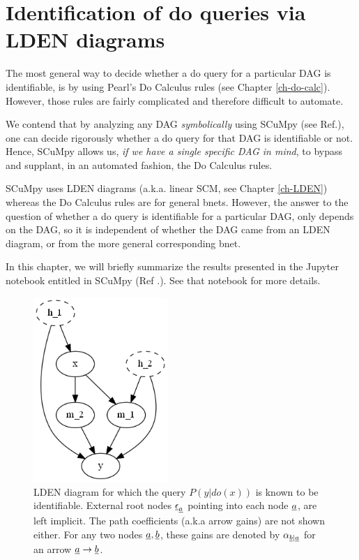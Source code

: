 \chapter{Identification of do queries via LDEN
diagrams}
\label{ch-iden-LDEN}

The most general way to decide whether a do query for
a particular DAG is identifiable, is by using Pearl's
Do Calculus rules (see Chapter \ref{ch-do-calc}). However, those rules are fairly 
complicated and therefore difficult to automate.


We contend that by analyzing any DAG {\it symbolically} using 
SCuMpy (see Ref.\cite{scumpy}), one can decide rigorously 
whether a
do query for that DAG is identifiable or not. Hence, SCuMpy
allows us, {\it if we have a single specific DAG in mind}, to bypass and supplant, in an automated 
fashion, the Do Calculus rules.

SCuMpy uses
LDEN diagrams (a.k.a. linear SCM, see Chapter \ref{ch-LDEN}) whereas
the Do Calculus rules are for general bnets.
However, the answer to the question
of whether a do query is identifiable
for a particular DAG,
only depends on the DAG,
so it is independent of whether
the DAG came from an LDEN diagram, or from
the more general corresponding bnet.


In this chapter,
we will briefly summarize the results
presented in the
Jupyter notebook entitled  in SCuMpy (Ref
.\cite{scumpy}). See that notebook
for more details.

\begin{figure}[h!]
\centering
\includegraphics[width=2in]
{iden-LDEN/uncon-children.png}
\caption{LDEN diagram for which 
the query $P(y|do(x))$
is  known to be identifiable.
External root nodes $\rveps_\rva$ 
pointing into each node $\rva$,
are left implicit.
The path coefficients (a.k.a
arrow gains)
are not shown either. 
For any two nodes $\rva, \rvb$,
these gains
 are denoted
   by $\alp_{\rvb|\rva}$
for an arrow $\rva\rarrow \rvb$.}
\label{fig-uncon-children}
\end{figure}

